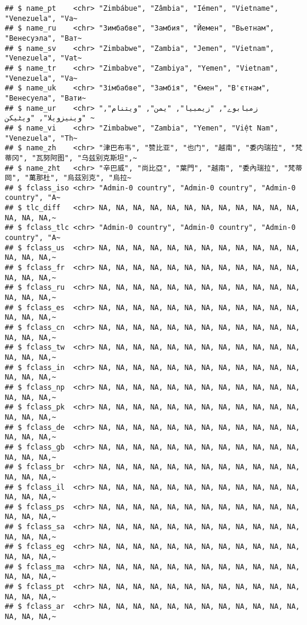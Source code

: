 \documentclass[
]{article}
\begin{document}
\begin{verbatim}
## $ name_pt    <chr> "Zimbábue", "Zâmbia", "Iémen", "Vietname", "Venezuela", "Va~
## $ name_ru    <chr> "Зимбабве", "Замбия", "Йемен", "Вьетнам", "Венесуэла", "Ват~
## $ name_sv    <chr> "Zimbabwe", "Zambia", "Jemen", "Vietnam", "Venezuela", "Vat~
## $ name_tr    <chr> "Zimbabve", "Zambiya", "Yemen", "Vietnam", "Venezuela", "Va~
## $ name_uk    <chr> "Зімбабве", "Замбія", "Ємен", "В'єтнам", "Венесуела", "Вати~
## $ name_ur    <chr> "زمبابوے", "زیمبیا", "یمن", "ویتنام", "وینیزویلا", "ویٹیکن ~
## $ name_vi    <chr> "Zimbabwe", "Zambia", "Yemen", "Việt Nam", "Venezuela", "Th~
## $ name_zh    <chr> "津巴布韦", "赞比亚", "也门", "越南", "委内瑞拉", "梵蒂冈", "瓦努阿图", "乌兹别克斯坦",~
## $ name_zht   <chr> "辛巴威", "尚比亞", "葉門", "越南", "委內瑞拉", "梵蒂岡", "萬那杜", "烏茲別克", "烏拉~
## $ fclass_iso <chr> "Admin-0 country", "Admin-0 country", "Admin-0 country", "A~
## $ tlc_diff   <chr> NA, NA, NA, NA, NA, NA, NA, NA, NA, NA, NA, NA, NA, NA, NA,~
## $ fclass_tlc <chr> "Admin-0 country", "Admin-0 country", "Admin-0 country", "A~
## $ fclass_us  <chr> NA, NA, NA, NA, NA, NA, NA, NA, NA, NA, NA, NA, NA, NA, NA,~
## $ fclass_fr  <chr> NA, NA, NA, NA, NA, NA, NA, NA, NA, NA, NA, NA, NA, NA, NA,~
## $ fclass_ru  <chr> NA, NA, NA, NA, NA, NA, NA, NA, NA, NA, NA, NA, NA, NA, NA,~
## $ fclass_es  <chr> NA, NA, NA, NA, NA, NA, NA, NA, NA, NA, NA, NA, NA, NA, NA,~
## $ fclass_cn  <chr> NA, NA, NA, NA, NA, NA, NA, NA, NA, NA, NA, NA, NA, NA, NA,~
## $ fclass_tw  <chr> NA, NA, NA, NA, NA, NA, NA, NA, NA, NA, NA, NA, NA, NA, NA,~
## $ fclass_in  <chr> NA, NA, NA, NA, NA, NA, NA, NA, NA, NA, NA, NA, NA, NA, NA,~
## $ fclass_np  <chr> NA, NA, NA, NA, NA, NA, NA, NA, NA, NA, NA, NA, NA, NA, NA,~
## $ fclass_pk  <chr> NA, NA, NA, NA, NA, NA, NA, NA, NA, NA, NA, NA, NA, NA, NA,~
## $ fclass_de  <chr> NA, NA, NA, NA, NA, NA, NA, NA, NA, NA, NA, NA, NA, NA, NA,~
## $ fclass_gb  <chr> NA, NA, NA, NA, NA, NA, NA, NA, NA, NA, NA, NA, NA, NA, NA,~
## $ fclass_br  <chr> NA, NA, NA, NA, NA, NA, NA, NA, NA, NA, NA, NA, NA, NA, NA,~
## $ fclass_il  <chr> NA, NA, NA, NA, NA, NA, NA, NA, NA, NA, NA, NA, NA, NA, NA,~
## $ fclass_ps  <chr> NA, NA, NA, NA, NA, NA, NA, NA, NA, NA, NA, NA, NA, NA, NA,~
## $ fclass_sa  <chr> NA, NA, NA, NA, NA, NA, NA, NA, NA, NA, NA, NA, NA, NA, NA,~
## $ fclass_eg  <chr> NA, NA, NA, NA, NA, NA, NA, NA, NA, NA, NA, NA, NA, NA, NA,~
## $ fclass_ma  <chr> NA, NA, NA, NA, NA, NA, NA, NA, NA, NA, NA, NA, NA, NA, NA,~
## $ fclass_pt  <chr> NA, NA, NA, NA, NA, NA, NA, NA, NA, NA, NA, NA, NA, NA, NA,~
## $ fclass_ar  <chr> NA, NA, NA, NA, NA, NA, NA, NA, NA, NA, NA, NA, NA, NA, NA,~

\end{verbatim}
\end{document}
